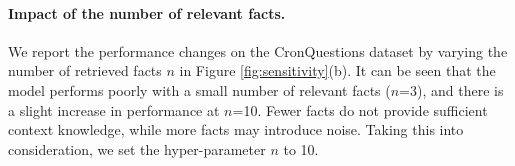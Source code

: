 \documentclass[11pt]{article}
\begin{document}
\paragraph{Impact of the number of relevant facts.}
We report the performance changes on the CronQuestions dataset by varying the number of retrieved facts $n$ in Figure \ref{fig:sensitivity}(b).
It can be seen that the model performs poorly with a small number of relevant facts ($n$=3), and there is a slight increase in performance at $n$=10. Fewer facts do not provide sufficient context knowledge, while more facts may introduce noise. Taking this into consideration, we set the hyper-parameter $n$ to 10.


    
\end{document}
